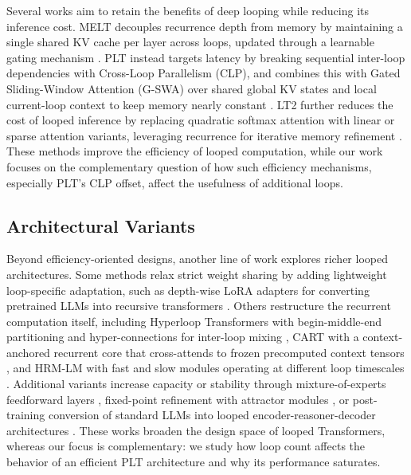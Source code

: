 Several works aim to retain the benefits of deep looping while reducing its inference cost. MELT decouples recurrence depth from memory by maintaining a single shared KV cache per layer across loops, updated through a learnable gating mechanism \citep{vendrell2026memoryefficient}. PLT instead targets latency by breaking sequential inter-loop dependencies with Cross-Loop Parallelism (CLP), and combines this with Gated Sliding-Window Attention (G-SWA) over shared global KV states and local current-loop context to keep memory nearly constant \citep{wu2025parallel}. LT2 further reduces the cost of looped inference by replacing quadratic softmax attention with linear or sparse attention variants, leveraging recurrence for iterative memory refinement \citep{deng2026lt2}. These methods improve the efficiency of looped computation, while our work focuses on the complementary question of how such efficiency mechanisms, especially PLT's CLP offset, affect the usefulness of additional loops.

\subsection{Architectural Variants}
\label{sec:related-variants}

Beyond efficiency-oriented designs, another line of work explores richer looped architectures. Some methods relax strict weight sharing by adding lightweight loop-specific adaptation, such as depth-wise LoRA adapters for converting pretrained LLMs into recursive transformers \citep{bae2024relaxed}. Others restructure the recurrent computation itself, including Hyperloop Transformers with begin-middle-end partitioning and hyper-connections for inter-loop mixing \citep{zeitoun2026hyperloop}, CART with a context-anchored recurrent core that cross-attends to frozen precomputed context tensors \citep{capps2026cart}, and HRM-LM with fast and slow modules operating at different loop timescales \citep{han2026hierarchical}. Additional variants increase capacity or stability through mixture-of-experts feedforward layers \citep{csords2024moeut}, fixed-point refinement with attractor modules \citep{feinashley2026solve}, or post-training conversion of standard LLMs into looped encoder-reasoner-decoder architectures \citep{park2026loopus}. These works broaden the design space of looped Transformers, whereas our focus is complementary: we study how loop count affects the behavior of an efficient PLT architecture and why its performance saturates.


